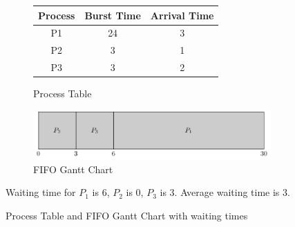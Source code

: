 \documentclass{book/custombook}
\begin{document}
                \begin{figure}[H]
                    \centering
                    \begin{subfigure}{0.5\textwidth}
                        \centering
                        \begin{tabular}{ccc}
                            Process & Burst Time & Arrival Time\\
                            \toprule
                            P1 & 24 & 3\\
                            P2 & 3  & 1\\
                            P3 & 3  & 2\\
                            \bottomrule
                        \end{tabular}
                        \caption{Process Table}
                    \end{subfigure}%
                    \begin{subfigure}{0.5\textwidth}
                        \centering
                        \includegraphics[width=\linewidth]{figures/fifo_gantt_2.pdf}
                        \caption{FIFO Gantt Chart}
                    \end{subfigure}
                    Waiting time for $P_1$ is 6, $P_2$ is 0, $P_3$ is 3. Average waiting time is 3.
                    \caption{Process Table and FIFO Gantt Chart with waiting times}
                \end{figure}
\end{document}
